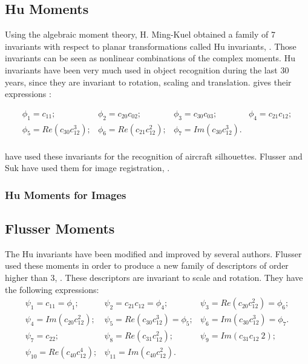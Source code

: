 \subsection{Hu Moments}
\label{sec:HuMoments}
Using the algebraic moment theory, H. Ming-Kuel obtained a family of 7
invariants with respect to planar transformations called Hu invariants,
\cite{hu}. Those invariants can be seen as nonlinear combinations of
the complex moments. Hu invariants have
been very much used in object recognition during the last 30 years,
since they are invariant to rotation, scaling and translation. \cite{flusserinv} gives their expressions :

\begin{equation}
\begin{array}{cccc}
\phi_1 = c_{11};& \phi_2 = c_{20}c_{02};& \phi_3 = c_{30}c_{03};& \phi_4 = c_{21}c_{12};\\
\phi_5 = Re(c_{30}c_{12}^3);& \phi_6 = Re(c_{21}c_{12}^2);& \phi_7 = Im(c_{30}c_{12}^3).&\\
\end{array}
\end{equation}


\cite{dudani} have used these invariants for the recognition of
aircraft silhouettes. Flusser and Suk have used them for image
registration, \cite{flusser_2}.

\subsubsection{Hu Moments for Images}

%


\subsection{Flusser Moments}
\label{sec:FlusserMoments}
The Hu invariants have been modified and
improved by several authors. Flusser used these moments in order to
produce a new family of descriptors of order higher than 3,
\cite{flusserinv}. These descriptors are invariant to scale and
rotation. They have the following expressions:
\begin {equation}
\begin{array}{ccc}
\psi_1  = c_{11} = \phi_1; &  \psi_2  = c_{21}c_{12} = \phi_4; & \psi_3  = Re(c_{20}c_{12}^2) = \phi_6;\\
\psi_4  = Im(c_{20}c_{12}^2); & \psi_5  = Re(c_{30}c_{12}^3) = \phi_5;
& \psi_6  = Im(c_{30}c_{12}^3) = \phi_7.\\
\psi_7  = c_{22}; & \psi_8  = Re(c_{31}c_{12}^2); & \psi_9  = Im(c_{31}c_{12}~2);\\
\psi_{10} = Re(c_{40}c_{12}^4); & \psi_{11} = Im(c_{40}c_{12}^2). &\\

\end{array}
\end {equation}

